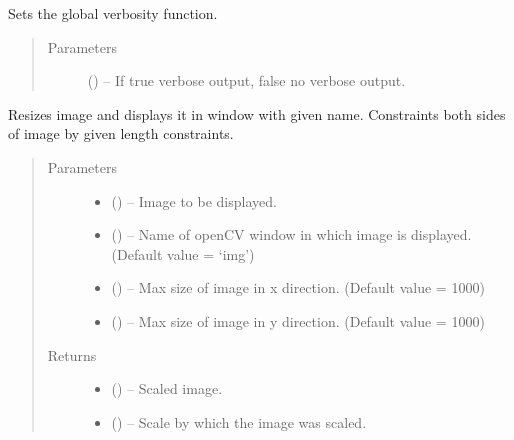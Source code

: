 \documentclass[letterpaper,10pt,english]{sphinxmanual}
\begin{document}
\begin{fulllineitems}
\label{\detokenize{image_helpers:image_helpers.set_verbose}}
Sets the global verbosity function.
\begin{quote}\begin{description}
\item[{Parameters}] \leavevmode
{} () -- If true verbose output, false no verbose output.

\end{description}\end{quote}

\end{fulllineitems}


\begin{fulllineitems}
\label{\detokenize{image_helpers:image_helpers.show_image}}
Resizes image and displays it in window with given name.
Constraints both sides of image by given length constraints.
\begin{quote}\begin{description}
\item[{Parameters}] \leavevmode\begin{itemize}
\item {} 
 () -- Image to be displayed.

\item {} 
 () -- Name of openCV window in which image is displayed. (Default value = `img')

\item {} 
 () -- Max size of image in x direction. (Default value = 1000)

\item {} 
 () -- Max size of image in y direction. (Default value = 1000)

\end{itemize}

\item[{Returns}] \leavevmode
\begin{itemize}
\item {} 
 () -- Scaled image.

\item {} 
 () -- Scale by which the image was scaled.

\end{itemize}


\end{description}\end{quote}

\end{fulllineitems}
\end{document}
